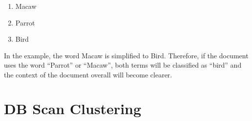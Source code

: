 \begin{enumerate}
\item Macaw
\item Parrot
\item Bird
\end{enumerate}

In the example, the word Macaw is simplified to Bird. Therefore, if
the document uses the word ``Parrot'' or ``Macaw'', both terms will
be classified as ``bird'' and the context of the document overall will
become clearer.

\section{DB Scan Clustering}

